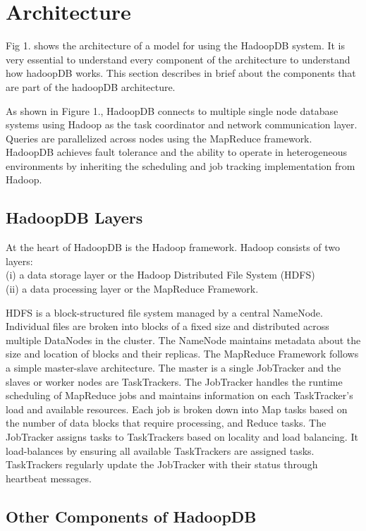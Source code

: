 \documentclass[9pt,twocolumn,twoside]{styles/osajnl}
\begin{document}
\section{Architecture}

Fig 1. shows the architecture\cite{hadoop-guide} of a model for using the HadoopDB system. It is very essential to understand every component of the architecture to understand how hadoopDB works. This section describes in brief about the components that are part of the hadoopDB architecture.

As shown in Figure 1., HadoopDB connects to multiple single node database systems using Hadoop as the task coordinator and network communication layer. Queries are parallelized across nodes using the MapReduce framework. HadoopDB achieves fault tolerance and the ability to operate in heterogeneous environments by
inheriting the scheduling and job tracking implementation from Hadoop.

\subsection{HadoopDB Layers}
At the heart of HadoopDB is the Hadoop\cite{apache-hadoop} framework. Hadoop consists of two layers: \\(i) a data storage layer or the Hadoop \cite{apace-web-page} Distributed
File System (HDFS) \\(ii) a data processing layer or the MapReduce Framework.

HDFS\cite{hadoop-cluster-setup} is a block-structured file system managed by a central NameNode. Individual files are broken into blocks of a fixed size and distributed across multiple DataNodes in the cluster. The
NameNode maintains metadata about the size and location of blocks and their replicas.
The MapReduce Framework follows a simple master-slave architecture. The master is a single JobTracker and the slaves or worker nodes are TaskTrackers. The JobTracker handles the runtime
scheduling of MapReduce jobs and maintains information on each TaskTracker’s load and available resources. Each job is broken down into Map tasks based on the number of data blocks that
require processing, and Reduce tasks. The JobTracker assigns tasks to TaskTrackers based on locality and load balancing. It load-balances by ensuring all available TaskTrackers are assigned tasks. TaskTrackers regularly update the JobTracker with their status through heartbeat messages.


\subsection{Other Components of HadoopDB}
\end{document}
